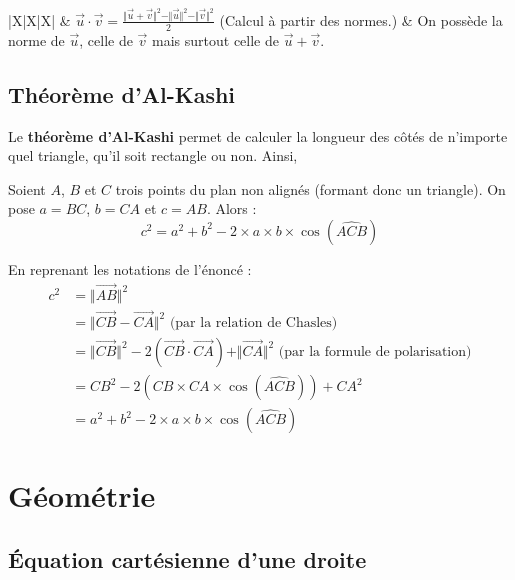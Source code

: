 \begin{tip}
\begin{whitetabularx}{|X|X|X|}
			\hline
			& $\overrightarrow{u} \cdot \overrightarrow{v} = \frac{\Vert \overrightarrow{u} + \overrightarrow{v} \Vert^2 - \Vert \overrightarrow{u} \Vert^2 - \Vert \overrightarrow{v} \Vert^2}{2}$ \medskip (Calcul à partir des normes.) & On possède la norme de $\overrightarrow{u}$, celle de $\overrightarrow{v}$ mais surtout celle de $\overrightarrow{u} + \overrightarrow{v}$. \\
			\hline
		\end{whitetabularx}
	\end{tip}

	\subsection{Théorème d'Al-Kashi}

	Le \textbf{théorème d'Al-Kashi} permet de calculer la longueur des côtés de n'importe quel triangle, qu'il soit rectangle ou non. Ainsi,

	\begin{formula}
		Soient $A$, $B$ et $C$ trois points du plan non alignés (formant donc un triangle). On pose $a = BC$, $b = CA$ et $c = AB$. Alors :
		\[ c^2 = a^2 + b^2 - 2 \times a \times b \times \cos(\widehat{ACB}) \]
	\end{formula}

	\begin{demonstration}
		\contentwidth[big]
		En reprenant les notations de l'énoncé :
		\begin{align*}
			c^2 &= \Vert \overrightarrow{AB} \Vert^2 \\
			&= \Vert \overrightarrow{CB} - \overrightarrow{CA} \Vert^2 \text{ (par la relation de Chasles)} \\
			&= \Vert \overrightarrow{CB} \Vert^2 - 2(\overrightarrow{CB} \cdot \overrightarrow{CA}) + \Vert \overrightarrow{CA} \Vert^2 \text{ (par la formule de polarisation)} \\
			&= CB^2 - 2(CB \times CA \times \cos(\widehat{ACB})) + CA^2 \\
			&= a^2 + b^2 - 2 \times a \times b \times \cos(\widehat{ACB})
		\end{align*}
	\end{demonstration}

	\section{Géométrie}

	\subsection{Équation cartésienne d'une droite}


